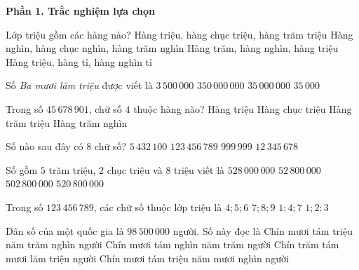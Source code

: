 \textbf{Phần 1. Trắc nghiệm lựa chọn}

\begin{ex} %
Lớp triệu gồm các hàng nào?
\choice
{\True Hàng triệu, hàng chục triệu, hàng trăm triệu}
{Hàng nghìn, hàng chục nghìn, hàng trăm nghìn}
{Hàng trăm, hàng nghìn, hàng triệu}
{Hàng triệu, hàng tỉ, hàng nghìn tỉ}
\end{ex}

\begin{ex} %
Số \textit{Ba mươi lăm triệu} được viết là
\choice
{$3\,500\,000$}
{$350\,000\,000$}
{\True $35\,000\,000$}
{$35\,000$}
\end{ex}

\begin{ex} %
Trong số $45\,678\,901$, chữ số $4$ thuộc hàng nào?
\choice
{Hàng triệu}
{\True Hàng chục triệu}
{Hàng trăm triệu}
{Hàng trăm nghìn}
\end{ex}

\begin{ex} %
Số nào sau đây có 8 chữ số?
\choice
{$5\,432\,100$}
{$123\,456\,789$}
{$999\,999$}
{\True $12\,345\,678$}
\end{ex}

\begin{ex} %
Số gồm $5$ trăm triệu, $2$ chục triệu và $8$ triệu viết là
\choice
{\True $528\,000\,000$}
{$52\,800\,000$}
{$502\,800\,000$}
{$520\,800\,000$}
\end{ex}

\begin{ex} %
Trong số $123\,456\,789$, các chữ số thuộc lớp triệu là
\choice
{$4; 5; 6$}
{$7; 8; 9$}
{$1; 4; 7$}
{\True $1; 2; 3$}
\end{ex}

\begin{ex} %
Dân số của một quốc gia là $98\,500\,000$ người. Số này đọc là
\choice
{\True Chín mươi tám triệu năm trăm nghìn người}
{Chín mươi tám nghìn năm trăm người}
{Chín trăm tám mươi lăm triệu người}
{Chín mươi tám triệu năm mươi nghìn người}
\end{ex}

